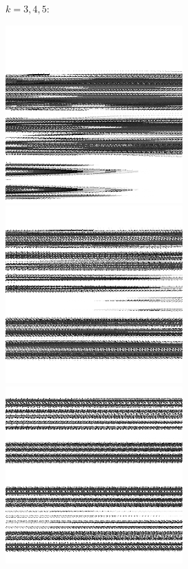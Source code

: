 \documentclass[11pt,class=report,crop=false]{standalone}
\begin{document}
\begin{activite}
\begin{center}
\end{center}
$k=3,4,5$:
\begin{center}
\includegraphics[scale=\myscale,scale=0.4]{images_chapter/clock_gimp_new_baker_3.png}\qquad
\includegraphics[scale=\myscale,scale=0.4]{images_chapter/clock_gimp_new_baker_4.png}\qquad
\includegraphics[scale=\myscale,scale=0.4]{images_chapter/clock_gimp_new_baker_5.png}
\end{center}


\end{activite}
\end{document}
